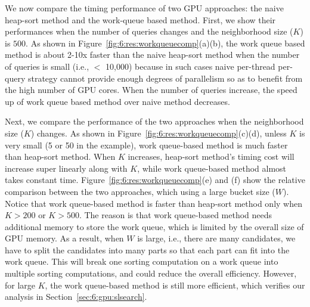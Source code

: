 We now compare the timing performance of two GPU approaches: the naive heap-sort method and the work-queue based method. First, we show their performances when the number of queries changes and the neighborhood size ($K$) is $500$. As shown in Figure~\ref{fig:6:res:workqueuecomp}(a)(b), the work queue based method is about 2-10x faster than the naive heap-sort method when the number of queries is small (i.e., $<$ 10,000) because in such cases naive per-thread per-query strategy cannot provide enough degrees of parallelism so as to benefit from the high number of GPU cores. When the number of queries increase, the speed up of work queue based method over naive method decreases.

Next, we compare the performance of the two approaches when the neighborhood size ($K$) changes. As shown in Figure~\ref{fig:6:res:workqueuecomp}(c)(d), unless $K$ is very small (5 or 50 in the example), work queue-based method is much faster than heap-sort method. When $K$ increases, heap-sort method's timing cost will increase super linearly along with $K$, while work queue-based method almost takes constant time. Figure~\ref{fig:6:res:workqueuecomp}(e) and (f) show the relative comparison between the two approaches, which using a large bucket size ($W$). Notice that work queue-based method is faster than heap-sort method only when $K > 200$ or $K > 500$. The reason is that work queue-based method needs additional memory to store the work queue, which is limited by the overall size of GPU memory. As a result, when $W$ is large, i.e., there are many candidates, we have to split the candidates into many parts so that each part can fit into the work queue. This will break one sorting computation on a work queue into multiple sorting computations, and could reduce the overall efficiency. However, for large $K$, the work queue-based method is still more efficient, which verifies our analysis in Section~\ref{sec:6:gpu:slsearch}.

